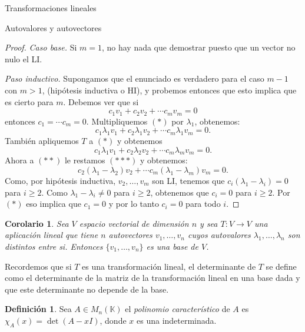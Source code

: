 \documentclass[a4paper,12pt,twoside,spanish]{amsbook}
\newtheorem{corolario}[teorema]{Corolario}
\theoremstyle{definition}
\newtheorem{definicion}{Definici\'on}[section]
\theoremstyle{remark}
\newcommand{\K}{\mathbb K}
\begin{document}
\begin{chapter}{Transformaciones lineales}
\begin{section}{Autovalores y autovectores}
\begin{proof}
			\textit{Caso base.} Si $m=1$, no hay nada que demostrar puesto que un vector no nulo el LI.
			
			\medskip
			
			\textit{Paso inductivo.} Supongamos que el enunciado es verdadero para el caso $m-1$ con $m>1$, (hipótesis inductiva o HI), y probemos entonces que esto implica que es cierto para $m$. Debemos ver  que si 
			\begin{equation}
			c_1v_1+	c_2v_2+ \cdots c_mv_m = 0 \tag{$*$}
			\end{equation}
			entonces $c_1 = \cdots c_m = 0$.
			Multipliquemos $(*)$ por $\lambda_1$, obtenemos:
			\begin{equation}
			c_1\lambda_1v_1+ c_2\lambda_1v_2+\cdots c_m\lambda_1v_m = 0. \tag{$**$}
			\end{equation}
			También apliquemos $T$ a $(*)$ y obtenemos
			\begin{equation}
			c_1\lambda_1v_1+ c_2\lambda_2v_2+\cdots c_m\lambda_mv_m = 0. \tag{$***$}
			\end{equation}
			Ahora a $(**)$ le restamos $(***)$ y obtenemos:
			\begin{equation}
			c_2(\lambda_1 -\lambda_2)v_2+\cdots c_m(\lambda_1 -\lambda_m)v_m = 0. 	 
			\end{equation}
			Como, por hipótesis inductiva, $v_2,\ldots,v_m$ son LI, tenemos que $c_i(\lambda_1 -\lambda_i)=0$ para $i\ge 2$. Como $\lambda_1 -\lambda_i \ne 0$ para $i\ge 2$, obtenemos que $c_i = 0$ para $i\ge 2$. Por $(*)$ eso implica que $c_1=0$ y por lo tanto $c_i=0$ para todo $i$.
		\end{proof}
		
		\begin{corolario}\label{cor-aut-li}
			Sea $V$ espacio vectorial de dimensión $n$ y sea $T: V \to V$ una aplicación lineal que tiene $n$
			autovectores $v_1,\ldots, v_n$ cuyos autovalores $\lambda_1,\ldots,\lambda_n$ son distintos entre
			si. Entonces $\{v_1,\ldots, v_n\}$ es una base de $V$.
		\end{corolario}
		
		Recordemos que si $T$  es una transformación lineal, el determinante de $T$  se define como el determinante de la matriz de la transformación lineal en una base dada y que este determinante no depende de la base.    
		
		\begin{definicion}
			Sea $A \in M_n(\K)$   el \textit{polinomio característico} de $A$ es $\chi_A(x) = \det(A-xI)$, donde $x$ es una indeterminada. 
			

\end{definicion}
\end{section}
\end{chapter}
\end{document}
